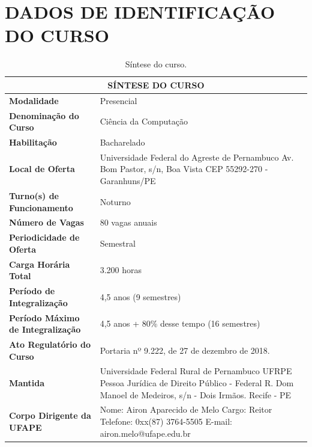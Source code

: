 \documentclass[
	12pt,				%
	openright,			%
  oneside,     %
	a4paper,			%
	chapter=TITLE,		%
	english,			%
	french,				%
	spanish,			%
	brazil				%
	]{abntex2}
\begin{document}
\chapter*[Dados de Identificação do Curso]{DADOS DE IDENTIFICAÇÃO DO CURSO}


\begin{center}
  \begin{footnotesize} 
  \begin{longtable}{lp{9.4cm}}
    \caption{\label{quadro:sintese-do-curso}Síntese do curso.}\\
    \toprule
    \multicolumn{2}{c}{\bfseries SÍNTESE DO CURSO} \\
    \midrule
    \textbf{Modalidade} & Presencial \\ \midrule
    \textbf{Denominação do Curso}	& Ciência da Computação \\ \midrule
    \textbf{Habilitação}	& Bacharelado \\ \midrule
    \textbf{Local de Oferta}	& Universidade Federal do Agreste de Pernambuco \newline Av. Bom Pastor, s/n, Boa Vista \newline CEP 55292-270 - Garanhuns/PE \\ \midrule
    \textbf{Turno(s) de Funcionamento}	 & Noturno \\ \midrule
    \textbf{Número de Vagas}	& 80 vagas anuais \\ \midrule
    \textbf{Periodicidade de Oferta}	& Semestral \\ \midrule
    \textbf{Carga Horária Total} & 3.200 horas \\ \midrule
    \textbf{Período de Integralização}	& 4,5 anos (9 semestres) \\ \midrule
    \textbf{Período Máximo de Integralização} 	& 4,5 anos + 80\% desse tempo (16 semestres) \\ \midrule
    \textbf{Ato Regulatório do Curso} &	Portaria nº 9.222, de 27 de dezembro de 2018. \\ \midrule
    \textbf{Mantida}	& Universidade Federal Rural de Pernambuco UFRPE \newline Pessoa Jurídica de Direito Público - Federal \newline R. Dom Manoel de Medeiros, s/n - Dois Irmãos. Recife - PE \\ \midrule
    \textbf{Corpo Dirigente da UFAPE}	& Nome: Airon Aparecido de Melo \newline Cargo: Reitor \newline Telefone: 0xx(87) 3764-5505 \newline E-mail: airon.melo@ufape.edu.br \\
\bottomrule
\end{longtable}
\end{footnotesize}
\end{center}
\end{document}
